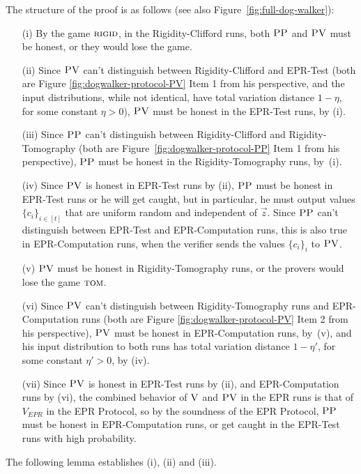 



\noindent The structure of the proof is as follows (see also Figure~\ref{fig:full-dog-walker}):
\begin{enumerate}
\item[(i)] By the game $\textsc{rigid}$, in the Rigidity-Clifford runs, both $\textsc{PP}$ and $\textsc{PV}$ must be honest, or they would lose the game.
\item[(ii)] Since $\textsc{PV}$ can't distinguish between Rigidity-Clifford and EPR-Test (both are Figure \ref{fig:dogwalker-protocol-PV} Item 1 from his perspective, and the input distributions, while not identical, have total variation distance $1 - \eta$, for some constant $\eta > 0$), $\textsc{PV}$ must be honest in the EPR-Test runs, by (i). 
\item[(iii)] Since $\textsc{PP}$ can't distinguish between Rigidity-Clifford and Rigidity-Tomography (both are Figure~\ref{fig:dogwalker-protocol-PP} Item 1 from his perspective), $\textsc{PP}$ must be honest in the Rigidity-Tomography runs, by~(i). 
\item[(iv)] Since $\textsc{PV}$ is honest in EPR-Test runs by (ii), $\textsc{PP}$ must be honest in EPR-Test runs or he will get caught, but in particular, he must output values $\{c_i\}_{i\in [t]}$ that are uniform random and independent of $\vec{z}$. Since $\textsc{PP}$ can't distinguish between EPR-Test and EPR-Computation runs, this is also true in EPR-Computation runs, when the verifier sends the values $\{c_i\}_i$ to $\textsc{PV}$. 
\item[(v)] $\textsc{PV}$ must be honest in Rigidity-Tomography runs, or the provers would lose the game $\textsc{tom}$.
\item[(vi)] Since $\textsc{PV}$ can't distinguish between Rigidity-Tomography runs and EPR-Computation runs (both are Figure \ref{fig:dogwalker-protocol-PV} Item 2 from his perspective), $\textsc{PV}$ must be honest in EPR-Computation runs, by~(v), and his input distribution to both runs has total variation distance $1 - \eta'$, for some constant $\eta' > 0$, by (iv).
\item[(vii)] Since $\textsc{PV}$ is honest in EPR-Test runs by (ii), and EPR-Computation runs by (vi), the combined behavior of $\textsc{V}$ and $\textsc{PV}$ in the EPR runs is that of $V_{EPR}$ in the EPR Protocol, so
by the soundness of the EPR Protocol, $\textsc{PP}$ must be honest in EPR-Computation runs, or get caught in the EPR-Test runs with high probability.
\end{enumerate}

 The following lemma establishes (i), (ii) and (iii). 

